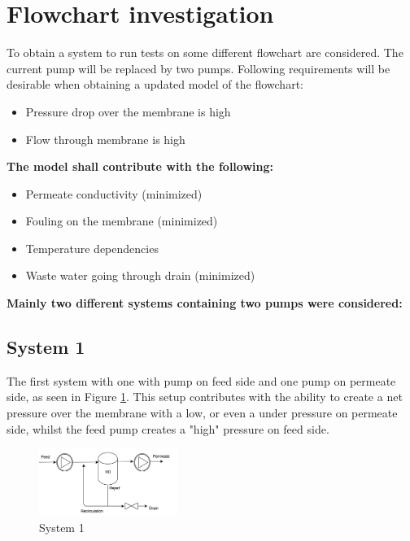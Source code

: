 
\section{Flowchart investigation}
\label{Flowchart}
To obtain a system to run tests on some different flowchart are considered. The current pump will be replaced by two pumps. Following requirements will be desirable when obtaining a updated model of the flowchart:

\begin{itemize}
\renewcommand\labelitemi{ }
\item Pressure drop over the membrane is high
\item Flow through membrane is high
\end{itemize}
\textbf{The model shall contribute with the following:}
\begin{itemize}
\renewcommand\labelitemi{ }
\item Permeate conductivity (minimized)
\item Fouling on the membrane (minimized)
\item Temperature dependencies 
\item Waste water going through drain (minimized)
\end{itemize}

\textbf{Mainly two different systems containing two pumps were considered:}

\subsection{System 1}
The first system with one with pump on feed side and one pump on permeate side, as seen in Figure \ref{fig:FlowCInves1}. This setup contributes with the ability to create a net pressure over the membrane with a low, or even a under pressure on permeate side, whilst the feed pump creates a "high" pressure on feed side.

\begin{figure}[h]
    \centering
    \includegraphics[width=0.4\textwidth]{FlowCInves1}
    \caption{System 1}
    \label{fig:FlowCInves1}
\end{figure}

